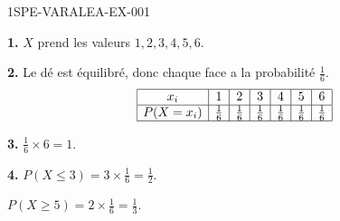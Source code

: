 \begin{corrige}{1SPE-VARALEA-EX-001}

\textbf{1.} $X$ prend les valeurs $1, 2, 3, 4, 5, 6$.

\medskip
\textbf{2.} Le dé est équilibré, donc chaque face a la probabilité $\frac{1}{6}$.
\[
\begin{array}{|c|c|c|c|c|c|c|}
\hline
x_i & 1 & 2 & 3 & 4 & 5 & 6 \\
\hline
P(X = x_i) & \frac{1}{6} & \frac{1}{6} & \frac{1}{6} & \frac{1}{6} & \frac{1}{6} & \frac{1}{6} \\
\hline
\end{array}
\]

\medskip
\textbf{3.} $\frac{1}{6} \times 6 = 1$. \checkmark

\medskip
\textbf{4.} $P(X \leq 3) = 3 \times \frac{1}{6} = \frac{1}{2}$.

$P(X \geq 5) = 2 \times \frac{1}{6} = \frac{1}{3}$.

\end{corrige}
